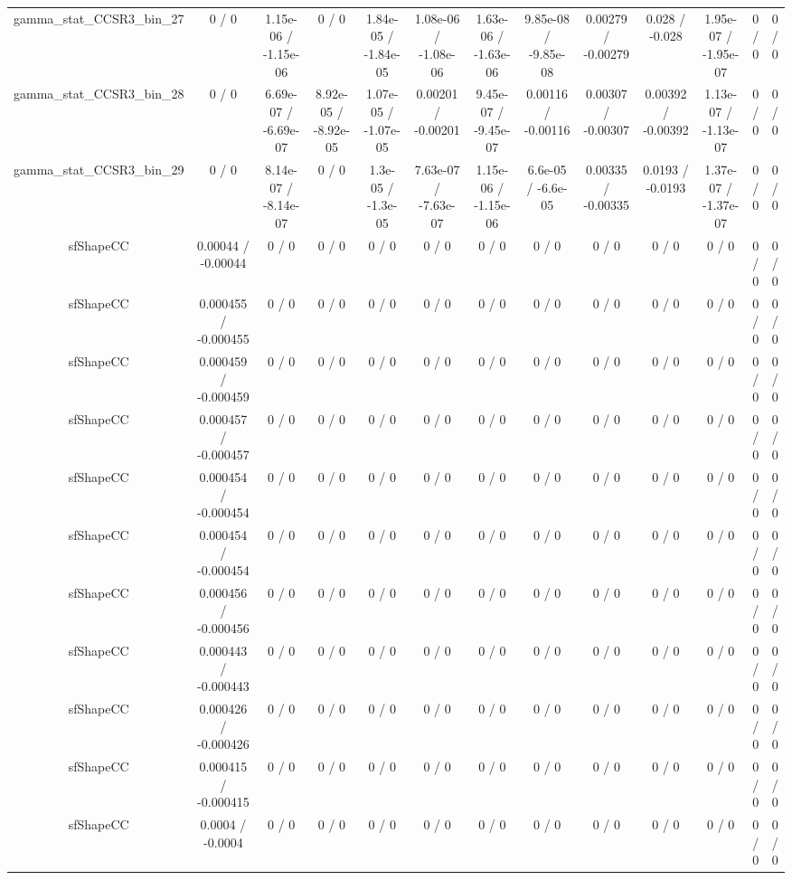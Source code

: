 \documentclass[10pt]{article}
\begin{document}
\begin{table}[htbp]
\begin{center}
\begin{tabular}{|c|c|c|c|c|c|c|c|c|c|c|c|c|}
  gamma_stat_CCSR3_bin_27 & 0 / 0 & 1.15e-06 / -1.15e-06 & 0 / 0 & 1.84e-05 / -1.84e-05 & 1.08e-06 / -1.08e-06 & 1.63e-06 / -1.63e-06 & 9.85e-08 / -9.85e-08 & 0.00279 / -0.00279 & 0.028 / -0.028 & 1.95e-07 / -1.95e-07 & 0 / 0 & 0 / 0 \\ 
  gamma_stat_CCSR3_bin_28 & 0 / 0 & 6.69e-07 / -6.69e-07 & 8.92e-05 / -8.92e-05 & 1.07e-05 / -1.07e-05 & 0.00201 / -0.00201 & 9.45e-07 / -9.45e-07 & 0.00116 / -0.00116 & 0.00307 / -0.00307 & 0.00392 / -0.00392 & 1.13e-07 / -1.13e-07 & 0 / 0 & 0 / 0 \\ 
  gamma_stat_CCSR3_bin_29 & 0 / 0 & 8.14e-07 / -8.14e-07 & 0 / 0 & 1.3e-05 / -1.3e-05 & 7.63e-07 / -7.63e-07 & 1.15e-06 / -1.15e-06 & 6.6e-05 / -6.6e-05 & 0.00335 / -0.00335 & 0.0193 / -0.0193 & 1.37e-07 / -1.37e-07 & 0 / 0 & 0 / 0 \\ 
  sfShapeCC & 0.00044 / -0.00044 & 0 / 0 & 0 / 0 & 0 / 0 & 0 / 0 & 0 / 0 & 0 / 0 & 0 / 0 & 0 / 0 & 0 / 0 & 0 / 0 & 0 / 0 \\ 
  sfShapeCC & 0.000455 / -0.000455 & 0 / 0 & 0 / 0 & 0 / 0 & 0 / 0 & 0 / 0 & 0 / 0 & 0 / 0 & 0 / 0 & 0 / 0 & 0 / 0 & 0 / 0 \\ 
  sfShapeCC & 0.000459 / -0.000459 & 0 / 0 & 0 / 0 & 0 / 0 & 0 / 0 & 0 / 0 & 0 / 0 & 0 / 0 & 0 / 0 & 0 / 0 & 0 / 0 & 0 / 0 \\ 
  sfShapeCC & 0.000457 / -0.000457 & 0 / 0 & 0 / 0 & 0 / 0 & 0 / 0 & 0 / 0 & 0 / 0 & 0 / 0 & 0 / 0 & 0 / 0 & 0 / 0 & 0 / 0 \\ 
  sfShapeCC & 0.000454 / -0.000454 & 0 / 0 & 0 / 0 & 0 / 0 & 0 / 0 & 0 / 0 & 0 / 0 & 0 / 0 & 0 / 0 & 0 / 0 & 0 / 0 & 0 / 0 \\ 
  sfShapeCC & 0.000454 / -0.000454 & 0 / 0 & 0 / 0 & 0 / 0 & 0 / 0 & 0 / 0 & 0 / 0 & 0 / 0 & 0 / 0 & 0 / 0 & 0 / 0 & 0 / 0 \\ 
  sfShapeCC & 0.000456 / -0.000456 & 0 / 0 & 0 / 0 & 0 / 0 & 0 / 0 & 0 / 0 & 0 / 0 & 0 / 0 & 0 / 0 & 0 / 0 & 0 / 0 & 0 / 0 \\ 
  sfShapeCC & 0.000443 / -0.000443 & 0 / 0 & 0 / 0 & 0 / 0 & 0 / 0 & 0 / 0 & 0 / 0 & 0 / 0 & 0 / 0 & 0 / 0 & 0 / 0 & 0 / 0 \\ 
  sfShapeCC & 0.000426 / -0.000426 & 0 / 0 & 0 / 0 & 0 / 0 & 0 / 0 & 0 / 0 & 0 / 0 & 0 / 0 & 0 / 0 & 0 / 0 & 0 / 0 & 0 / 0 \\ 
  sfShapeCC & 0.000415 / -0.000415 & 0 / 0 & 0 / 0 & 0 / 0 & 0 / 0 & 0 / 0 & 0 / 0 & 0 / 0 & 0 / 0 & 0 / 0 & 0 / 0 & 0 / 0 \\ 
  sfShapeCC & 0.0004 / -0.0004 & 0 / 0 & 0 / 0 & 0 / 0 & 0 / 0 & 0 / 0 & 0 / 0 & 0 / 0 & 0 / 0 & 0 / 0 & 0 / 0 & 0 / 0 \\ 

\end{tabular}
\end{center}
\end{table}
\end{document}

